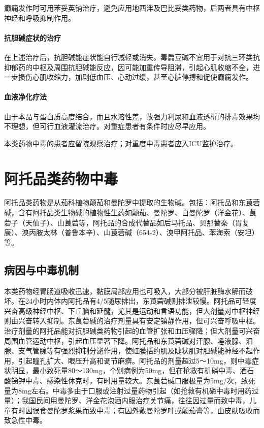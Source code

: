 癫痫发作时可用苯妥英钠治疗，避免应用地西泮及巴比妥类药物，后两者具有中枢神经和呼吸抑制作用。

\paragraph{抗胆碱症状的治疗}

在上述治疗后，抗胆碱能症状能自行减轻或消失。毒扁豆碱不宜用于对抗三环类抗抑郁药的中枢及周围抗胆碱能反应，因可能加重传导阻滞，引起心肌收缩不全，进一步损伤心肌收缩力，加剧低血压、心动过缓，甚至心脏停搏和促使癫痫发作。

\paragraph{血液净化疗法}

由于本品与蛋白质高度结合，而且水溶性差，故强力利尿和血液透析的排毒效果均不理想，但可行血液灌流治疗。对重症患者有条件时应尽早应用。

本类药物中毒的患者应留院观察治疗；对重度中毒患者应入ICU监护治疗。

\protect\hypertarget{text00135.html}{}{}

\section{阿托品类药物中毒}

阿托品类药物是从茄科植物颠茄和曼陀罗中提取的生物碱。包括：阿托品和东莨菪碱，含有阿托品类生物碱的植物性生药如颠茄、曼陀罗、白曼陀罗（洋金花）、莨菪子（天仙子）、山莨菪等，阿托品的合成代替品如后马托品、贝那替秦（胃复康）、溴丙胺太林（普鲁本辛）、山莨菪碱（654-2）、溴甲阿托品、苯海索（安坦）等。

\subsection{病因与中毒机制}

本类药物经胃肠道吸收迅速，黏膜局部应用也可吸入，大部分被肝脏酶水解而破坏。在24小时内体内阿托品有4/5随尿排出，东莨菪碱则排泄较慢。阿托品可轻度兴奋高级神经中枢、下丘脑和延髓，尤其是运动和言语功能，但大剂量对中枢神经则由兴奋转入抑制。东莨菪碱的治疗剂量具有安定镇静作用，但可兴奋呼吸中枢。治疗剂量的阿托品能对抗胆碱类药物引起的血管扩张和血压骤降；但大剂量可兴奋周围血管运动中枢，引起血压显著下降。阿托品和东莨菪碱对汗腺、唾液腺、泪腺、支气管腺等有强烈抑制分泌作用，使虹膜括约肌及睫状肌对胆碱能神经不起作用，引起瞳孔扩大、眼压升高和调节麻痹。阿托品的剂量超过5～10mg，则中毒症状明显，最小致死量80～130mg，个别病例为50mg，但在抢救有机磷中毒、酒石酸锑钾中毒、感染性休克时，有时用量较大。东莨菪碱口服极量为5mg/次，致死量为8mg左右。中毒多由于口服或注射过量药物引起（如抢救有机磷中毒时用药过量）；我国民间用曼陀罗、洋金花泡酒内服治疗关节痛，往往因过量而致中毒，儿童有时因误食曼陀罗浆果而致中毒；有因外敷曼陀罗叶或颠茄膏等，由皮肤吸收而致急性中毒。

